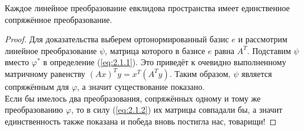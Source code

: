 \documentclass[11pt]{article}
\begin{document}
\begin{theorem}
    Каждое линейное преобразование евклидова пространства имеет единственное сопряжённое преобразование.
\end{theorem}

\begin{proof}
    Для доказательства выберем ортонормированный базис $e$ и рассмотрим линейное преобразование $\psi$, матрица которого в базисе $e$ равна $A^T$. Подставим $\psi$ вместо $\varphi^{\ast}$ в определение (\ref{eq:2.1.1}). Это приведёт к очевидно выполненному матричному равенству $(Ax)^Ty = x^T (A^T y)$. Таким образом, $\psi$ является сопряжённым для $\varphi$, а значит существование показано. \\
    Если бы имелось два преобразования, сопряжённых одному и тому же преобразованию $\varphi$, то в силу (\ref{eq:2.1.2}) их матрицы совпадали бы, а значит единственность также показана и победа вновь постигла нас, товарищи!
\end{proof}
\end{document}
